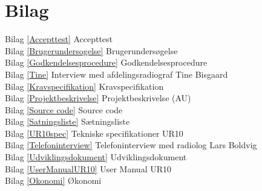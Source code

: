 \chapter{Bilag}\label{kapitel_Bilag}

Bilag \ref{Accepttest} Accepttest \\
Bilag \ref{Brugerundersogelse} Brugerundersøgelse\\
Bilag \ref{Godkendelsesprocedure} Godkendelsesprocedure \\
Bilag \ref{Tine} Interview med afdelingsradiograf Tine Bisgaard \\
Bilag \ref{Kravspecifikation} Kravspecifikation \\
Bilag \ref{Projektbeskrivelse} Projektbeskrivelse (AU) \\
Bilag \ref{Source code} Source code \\
Bilag \ref{Satningsliste} Sætningsliste \\
Bilag \ref{UR10spec} Tekniske specifikationer UR10 \\
Bilag \ref{Telefoninterview} Telefoninterview med radiolog Lars Boldvig \\
Bilag \ref{Udviklingsdokument} Udviklingsdokument \\
Bilag \ref{UserManualUR10} User Manual UR10 \\
Bilag \ref{Okonomi} Økonomi \\



